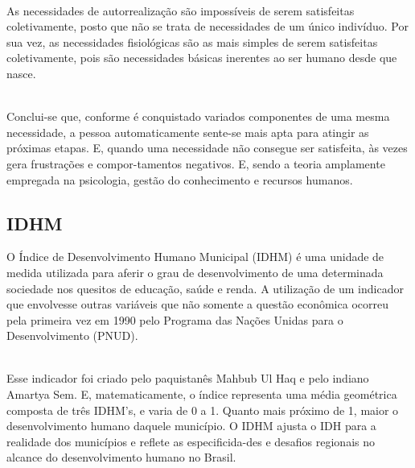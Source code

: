 \documentclass[a4paper, 10pt]{article}
\begin{document}
\\
As necessidades de autorrealização são impossíveis de serem satisfeitas coletivamente, posto que não se trata de necessidades de um único indivíduo. Por sua vez, as necessidades fisiológicas são as mais simples de serem satisfeitas coletivamente, pois são necessidades básicas inerentes ao ser humano desde que nasce.

\\
Conclui-se que, conforme é conquistado variados componentes de uma mesma necessidade, a pessoa automaticamente sente-se mais apta para atingir as próximas etapas. E, quando uma necessidade não consegue ser satisfeita, às vezes gera frustrações e compor-tamentos negativos. E, sendo a teoria amplamente empregada na psicologia, gestão do conhecimento e recursos humanos.

\subsection{IDHM}

O Índice de Desenvolvimento Humano Municipal (IDHM) é uma unidade de medida utilizada para aferir o grau de desenvolvimento de uma determinada sociedade nos quesitos de educação, saúde e renda. A utilização de um indicador que envolvesse outras variáveis que não somente a questão econômica ocorreu pela primeira vez em 1990 pelo Programa das Nações Unidas para o Desenvolvimento (PNUD). 

\\
Esse indicador foi criado pelo paquistanês Mahbub Ul Haq e pelo indiano Amartya Sem. E, matematicamente, o índice representa uma média geométrica composta de  três IDHM's, e varia de 0 a 1. Quanto mais próximo de 1, maior o desenvolvimento humano daquele município. O IDHM ajusta o IDH para a realidade dos municípios e reflete as especificida-des e desafios regionais no alcance do desenvolvimento humano no Brasil.
\end{document}
